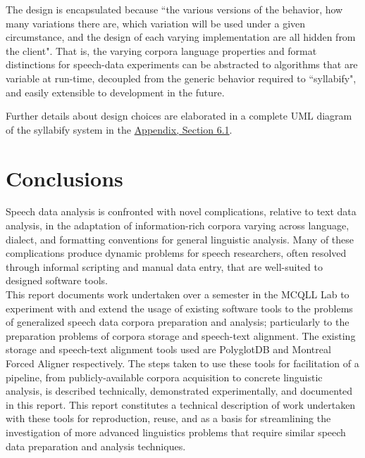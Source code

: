 \documentclass[11pt]{article}
\begin{document}
The design is encapsulated because ``the various versions of the behavior, how many variations there are, which variation will be used under a given circumstance, and the design of each varying implementation are all hidden from the client"\cite{bain_emergent_2008}. That is, the varying corpora language properties and format distinctions for speech-data experiments can be abstracted to algorithms that are variable at run-time, decoupled from the generic behavior required to ``syllabify", and easily extensible to development in the future.

Further details about design choices are elaborated in a complete UML diagram of the syllabify system in the \hyperlink{section.6}{Appendix, Section 6.1}.

\section{Conclusions}

Speech data analysis is confronted with novel complications, relative to text data analysis, in the adaptation of information-rich corpora varying across language, dialect, and formatting conventions for general linguistic analysis. Many of these complications produce dynamic problems for speech researchers, often resolved through informal scripting and manual data entry, that are well-suited to designed software tools. \\

This report documents work undertaken over a semester in the MCQLL Lab to experiment with and extend the usage of existing software tools to the problems of generalized speech data corpora preparation and analysis; particularly to the preparation problems of corpora storage and speech-text alignment. The existing storage and speech-text alignment tools used are PolyglotDB and Montreal Forced Aligner respectively. The steps taken to use these tools for facilitation of a pipeline, from publicly-available corpora acquisition to concrete linguistic analysis, is described technically, demonstrated experimentally, and documented in this report. This report constitutes a technical description of work undertaken with these tools for reproduction, reuse, and as a basis for streamlining the investigation of more advanced linguistics problems that require similar speech data preparation and analysis techniques. \\
\end{document}
